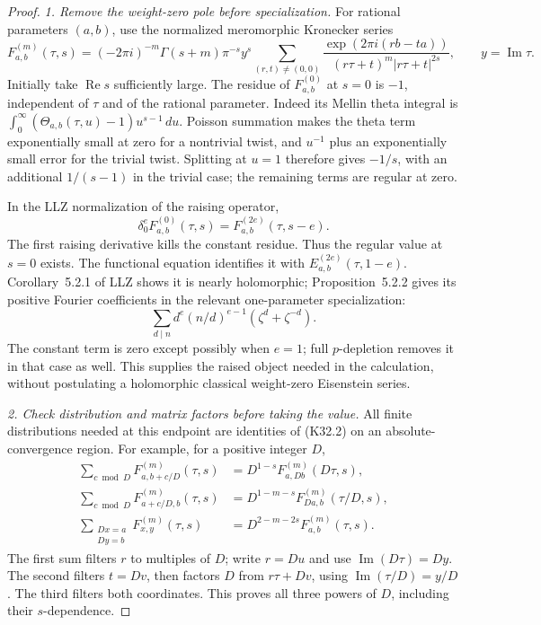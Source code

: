 \begin{proof}
\emph{1. Remove the weight-zero pole before specialization.}
For rational parameters \((a,b)\), use the normalized meromorphic
Kronecker series
\[
 F^{(m)}_{a,b}(\tau,s)=
 (-2\pi i)^{-m}\Gamma(s+m)\pi^{-s}y^s
 \sum_{(r,t)\ne(0,0)}
 \frac{\exp(2\pi i(rb-ta))}
 {(r\tau+t)^m|r\tau+t|^{2s}},
 \qquad y=\operatorname{Im}\tau .
 \tag{K32.2}
\]
Initially take \(\operatorname{Re}s\) sufficiently large.
The residue of \(F^{(0)}_{a,b}\) at \(s=0\) is \(-1\),
independent of \(\tau\) and of the rational parameter.
Indeed its Mellin theta integral is
\(\int_0^\infty(\Theta_{a,b}(\tau,u)-1)u^{s-1}\,du\).
Poisson summation makes the theta term exponentially small at
zero for a nontrivial twist, and \(u^{-1}\) plus an exponentially
small error for the trivial twist.  Splitting at \(u=1\)
therefore gives \(-1/s\), with an additional \(1/(s-1)\)
in the trivial case; the remaining terms are regular at zero.

In the LLZ normalization of the raising operator,
\[
 \delta_0^e F^{(0)}_{a,b}(\tau,s)
       =F^{(2e)}_{a,b}(\tau,s-e).
 \tag{K32.3}
\]
The first raising derivative kills the constant residue.
Thus the regular value at \(s=0\) exists.  The functional
equation identifies it with
\(E^{(2e)}_{a,b}(\tau,1-e)\).
Corollary~5.2.1 of LLZ shows it is nearly holomorphic;
Proposition~5.2.2 gives its positive Fourier coefficients
in the relevant one-parameter specialization:
\[
 \sum_{d\mid n}d^e(n/d)^{e-1}
       \left(\zeta^d+\zeta^{-d}\right).
 \tag{K32.4}
\]
The constant term is zero except possibly when \(e=1\);
full \(p\)-depletion removes it in that case as well.
This supplies the raised object needed in the calculation,
without postulating a holomorphic classical weight-zero
Eisenstein series.

\emph{2. Check distribution and matrix factors before taking the value.}
All finite distributions needed at this endpoint are identities
of (K32.2) on an absolute-convergence region.  For example,
for a positive integer \(D\),
\[
 \begin{split}
 \sum_{c\bmod D}F^{(m)}_{a,b+c/D}(\tau,s)
   &=D^{1-s}F^{(m)}_{a,Db}(D\tau,s),\\
 \sum_{c\bmod D}F^{(m)}_{a+c/D,b}(\tau,s)
   &=D^{1-m-s}F^{(m)}_{Da,b}(\tau/D,s),\\
 \sum_{\substack{Dx=a\\Dy=b}}F^{(m)}_{x,y}(\tau,s)
   &=D^{2-m-2s}F^{(m)}_{a,b}(\tau,s).
 \end{split}
 \tag{K32.5}
\]
The first sum filters \(r\) to multiples of \(D\); write
\(r=Du\) and use \(\operatorname{Im}(D\tau)=Dy\).
The second filters \(t=Dv\), then factors \(D\) from
\(r\tau+Dv\), using
\(\operatorname{Im}(\tau/D)=y/D\).
The third filters both coordinates.  This proves all
three powers of \(D\), including their \(s\)-dependence.


\end{proof}
